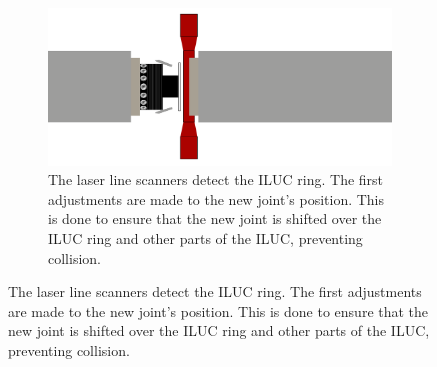 \begin{figure}[H]
\begin{subfigure}{0.7\textwidth}
        \label{fig:oop_track}
    \end{subfigure}
    \begin{subfigure}{0.7\textwidth}
        \includegraphics[width=\textwidth ]{images/lua_oop_ILUC_ring.png}
        \caption{The laser line scanners detect the ILUC ring. The first adjustments are made to the new joint's position.
            This is done to ensure that the new joint is shifted over the ILUC ring and other parts of the ILUC, preventing collision.}
        \label{fig:oop_ILUC_ring}
    \end{subfigure}
\end{figure}
